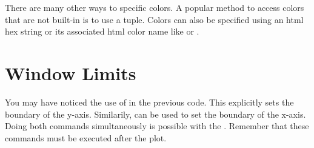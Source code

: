 There are many other ways to specific colors.
A popular method to access colors that are not built-in is to use a  tuple.
Colors can also be specified using an html hex string or its associated html color name like  or .

\section*{Window Limits} %

You may have noticed the use of  in the previous code. This explicitly sets the boundary of the y-axis. Similarily,  can be used to set the boundary of the x-axis.
Doing both commands simultaneously is possible with the .
Remember that these commands must be executed after the plot.

